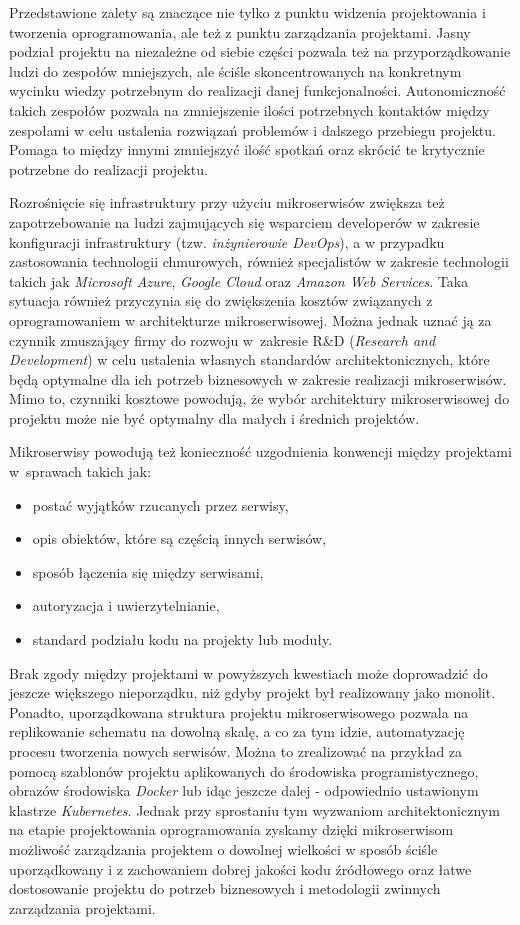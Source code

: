 \documentclass{SGGW-thesis}
\begin{document}
{Przedstawione zalety są znaczące nie tylko z punktu widzenia projektowania i tworzenia oprogramowania, ale też z punktu zarządzania projektami. Jasny podział projektu na niezależne od siebie części pozwala też na przyporządkowanie ludzi do zespołów mniejszych, ale ściśle skoncentrowanych na konkretnym wycinku wiedzy potrzebnym do realizacji danej funkcjonalności.
Autonomiczność takich zespołów pozwala na zmniejszenie ilości potrzebnych kontaktów między zespołami w celu ustalenia rozwiązań problemów i dalszego przebiegu projektu. Pomaga to między innymi zmniejszyć ilość spotkań oraz skrócić te krytycznie potrzebne do realizacji projektu.

Rozrośnięcie się infrastruktury przy użyciu mikroserwisów zwiększa też zapotrzebowanie na ludzi zajmujących się wsparciem developerów w zakresie konfiguracji infrastruktury (tzw. \textit{inżynierowie DevOps}), a w przypadku zastosowania technologii chmurowych, również specjalistów w zakresie technologii takich jak \textit{Microsoft Azure}, \textit{Google Cloud} oraz \textit{Amazon Web Services}. Taka sytuacja również przyczynia się do zwiększenia kosztów związanych z oprogramowaniem w architekturze mikroserwisowej. Można jednak uznać ją za czynnik zmuszający firmy do rozwoju w~zakresie R\&D (\textit{Research and Development}) w celu ustalenia własnych standardów architektonicznych, które będą optymalne dla ich potrzeb biznesowych w zakresie realizacji mikroserwisów. Mimo to, czynniki kosztowe powodują, że wybór architektury mikroserwisowej do projektu może nie być optymalny dla małych i średnich projektów.

Mikroserwisy powodują też konieczność uzgodnienia konwencji między projektami w~sprawach takich jak:

\begin{itemize}
	\item postać wyjątków rzucanych przez serwisy,
	\item opis obiektów, które są częścią innych serwisów,
	\item sposób łączenia się między serwisami,
	\item autoryzacja i uwierzytelnianie,
	\item standard podziału kodu na projekty lub moduły.
\end{itemize}
Brak zgody między projektami w powyższych kwestiach może doprowadzić do jeszcze większego nieporządku, niż gdyby projekt był realizowany jako monolit. Ponadto, uporządkowana struktura projektu mikroserwisowego pozwala na replikowanie schematu na dowolną skalę, a co za tym idzie, automatyzację procesu tworzenia nowych serwisów. Można to zrealizować na przykład za pomocą szablonów projektu aplikowanych do środowiska programistycznego, obrazów środowiska \textit{Docker} lub idąc jeszcze dalej - odpowiednio ustawionym klastrze \textit{Kubernetes}. Jednak przy sprostaniu tym wyzwaniom architektonicznym na etapie projektowania oprogramowania zyskamy dzięki mikroserwisom możliwość zarządzania projektem o dowolnej wielkości w sposób ściśle uporządkowany i z zachowaniem dobrej jakości kodu źródłowego oraz łatwe dostosowanie projektu do potrzeb biznesowych i metodologii zwinnych zarządzania projektami.

}
\end{document}
